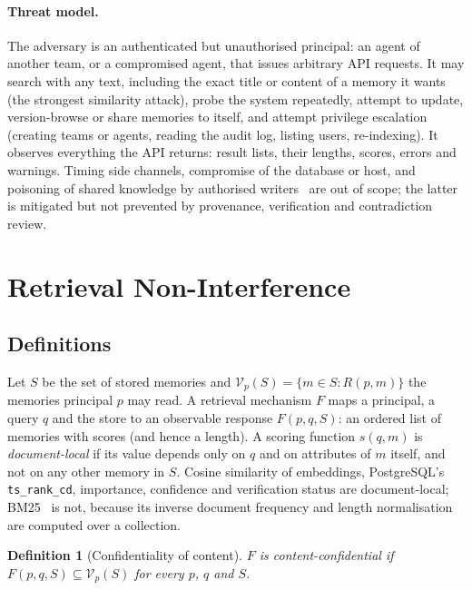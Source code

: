 \documentclass[11pt,a4paper]{article}
\newtheorem{definition}{Definition}
\theoremstyle{remark}
\newcommand{\vis}{\mathcal{V}}
\begin{document}
\paragraph{Threat model.} The adversary is an authenticated but unauthorised principal: an agent of
another team, or a compromised agent, that issues arbitrary API requests. It may search with any text,
including the exact title or content of a memory it wants (the strongest similarity attack), probe the system
repeatedly, attempt to update, version-browse or share memories to itself, and attempt privilege escalation
(creating teams or agents, reading the audit log, listing users, re-indexing). It observes everything the
API returns: result lists, their lengths, scores, errors and warnings. Timing side channels, compromise of the
database or host, and poisoning of shared knowledge by authorised writers~\cite{zou2025poisonedrag} are out
of scope; the latter is mitigated but not prevented by provenance, verification and contradiction review.

\section{Retrieval Non-Interference}
\label{sec:rni}

\subsection{Definitions}

Let $S$ be the set of stored memories and $\vis_p(S) = \{ m \in S : R(p,m) \}$ the memories principal $p$ may
read. A retrieval mechanism $F$ maps a principal, a query $q$ and the store to an observable response
$F(p,q,S)$: an ordered list of memories with scores (and hence a length). A scoring function $s(q,m)$ is
\emph{document-local} if its value depends only on $q$ and on attributes of $m$ itself, and not on any other
memory in $S$. Cosine similarity of embeddings, PostgreSQL's \texttt{ts\_rank\_cd}, importance, confidence and
verification status are document-local; BM25~\cite{robertson2009bm25} is not, because its inverse document
frequency and length normalisation are computed over a collection.

\begin{definition}[Confidentiality of content]
$F$ is \emph{content-confidential} if $F(p,q,S) \subseteq \vis_p(S)$ for every $p$, $q$ and $S$.
\end{definition}
\end{document}

